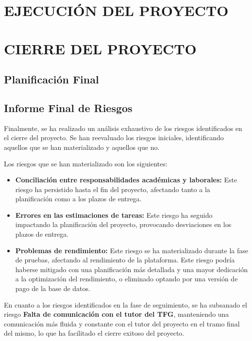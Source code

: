 \newpage
\section{EJECUCIÓN DEL PROYECTO}




\newpage
\section{CIERRE DEL PROYECTO}

\subsection{Planificación Final}


\subsection{Informe Final de Riesgos}
Finalmente, se ha realizado un análisis exhaustivo de los riesgos identificados en el cierre del proyecto. 
Se han reevaluado los riesgos iniciales, identificando aquellos que se han materializado y aquellos que no.

Los riesgos que se han materializado son los siguientes:
\begin{itemize}
\item \textbf{Conciliación entre responsabilidades académicas y laborales:} Este riesgo ha persistido hasta el fin del proyecto, 
afectando tanto a la planificación como a los plazos de entrega.
\item \textbf{Errores en las estimaciones de tareas:} Este riesgo ha seguido impactando la planificación del proyecto, 
provocando desviaciones en los plazos de entrega.
\item \textbf{Problemas de rendimiento:} Este riesgo se ha materializado durante la fase de pruebas, afectando al 
rendimiento de la plataforma. Este riesgo podría haberse mitigado con una planificación más detallada y una mayor dedicación a la optimización del rendimiento, 
o eliminado optando por una versión de pago de la base de datos.
\end{itemize}

En cuanto a los riesgos identificados en la fase de seguimiento, se ha subsanado el riesgo \textbf{Falta de comunicación con el tutor del TFG}, manteniendo una 
comunicación más fluida y constante con el tutor del proyecto en el tramo final del mismo, lo que ha facilitado el cierre exitoso del proyecto.




